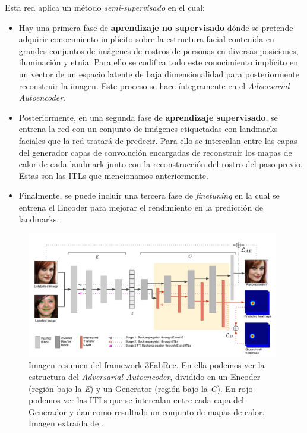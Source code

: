         \medskip

        \noindent Esta red aplica un método \textit{semi-supervisado} en el cual:

        \begin{itemize}
            \item Hay una primera fase de \textbf{aprendizaje no supervisado} dónde se pretende adquirir conocimiento implícito sobre la estructura facial contenida en grandes conjuntos de imágenes de rostros de personas en diversas posiciones, iluminación y etnia. Para ello se codifica todo este conocimiento implícito en un vector de un espacio latente de baja dimensionalidad para posteriormente reconstruir la imagen. Este proceso se hace íntegramente en el \textit{Adversarial Autoencoder}.
            \item Posteriormente, en una segunda fase de \textbf{aprendizaje supervisado}, se entrena la red con un conjunto de imágenes etiquetadas con landmarks faciales que la red tratará de predecir. Para ello se intercalan entre las capas del generador capas de convolución encargadas de reconstruir los mapas de calor de cada landmark junto con la reconstrucción del rostro del paso previo. Estas son las ITLs que mencionamos anteriormente.
            \item Finalmente, se puede incluir una tercera fase de \textit{finetuning} en la cual se entrena el Encoder para mejorar el rendimiento en la predicción de landmarks.
        \end{itemize} 

        \begin{figure}[!h]
            \centering
            \includegraphics[width=0.98\textwidth]{img/3fabrec_arquitectura.png}
            \caption{Imagen resumen del framework 3FabRec. En ella podemos ver la estructura del \textit{Adversarial Autoencoder}, dividido en un Encoder (región bajo la \textit{E}) y un Generator (región bajo la \textit{G}). En rojo podemos ver las ITLs que se intercalan entre cada capa del Generador y dan como resultado un conjunto de mapas de calor. Imagen extraída de \cite{browatzki20203fabrec}.}
            \label{fig:3FabRec Resumen}
        \end{figure}

